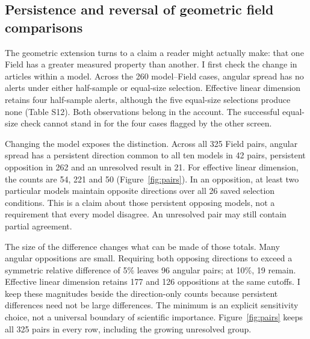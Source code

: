 \documentclass[12pt]{article}
\begin{document}
\subsection{Persistence and reversal of geometric field comparisons}
The geometric extension turns to a claim a reader might actually make: that one Field has a greater measured property than another. I first check the change in articles within a model. Across the 260 model--Field cases, angular spread has no alerts under either half-sample or equal-size selection. Effective linear dimension retains four half-sample alerts, although the five equal-size selections produce none (Table S12). Both observations belong in the account. The successful equal-size check cannot stand in for the four cases flagged by the other screen.

Changing the model exposes the distinction. Across all 325 Field pairs, angular spread has a persistent direction common to all ten models in 42 pairs, persistent opposition in 262 and an unresolved result in 21. For effective linear dimension, the counts are 54, 221 and 50 (Figure~\ref{fig:pairs}). In an opposition, at least two particular models maintain opposite directions over all 26 saved selection conditions. This is a claim about those persistent opposing models, not a requirement that every model disagree. An unresolved pair may still contain partial agreement.

The size of the difference changes what can be made of those totals. Many angular oppositions are small. Requiring both opposing directions to exceed a symmetric relative difference of 5\% leaves 96 angular pairs; at 10\%, 19 remain. Effective linear dimension retains 177 and 126 oppositions at the same cutoffs. I keep these magnitudes beside the direction-only counts because persistent differences need not be large differences. The minimum is an explicit sensitivity choice, not a universal boundary of scientific importance. Figure~\ref{fig:pairs} keeps all 325 pairs in every row, including the growing unresolved group.

\end{document}

